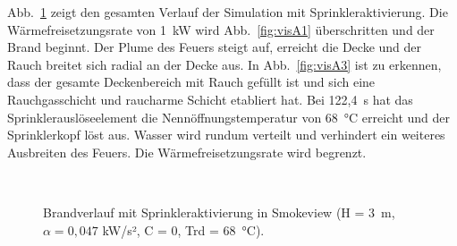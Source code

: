 Abb.~\ref{fig:visA} zeigt den gesamten Verlauf der Simulation mit Sprinkleraktivierung. Die Wärmefreisetzungsrate von 1~kW wird Abb.~\ref{fig:visA1} überschritten und der Brand beginnt. Der Plume des Feuers steigt auf, erreicht die Decke und der Rauch breitet sich radial an der Decke aus. In Abb.~\ref{fig:visA3} ist zu erkennen, dass der gesamte Deckenbereich mit Rauch gefüllt ist und sich eine Rauchgasschicht und raucharme Schicht etabliert hat. Bei 122,4~s hat das Sprinklerauslöseelement die Nennöffnungstemperatur von 68~°C erreicht und der Sprinklerkopf löst aus. Wasser wird rundum verteilt und verhindert ein weiteres Ausbreiten des Feuers. Die Wärmefreisetzungsrate wird begrenzt.
\begin{figure}[h]\centering
{}%
\hspace{8pt}%
\\
%
\hspace{8pt}%
%
\caption{Brandverlauf mit Sprinkleraktivierung in Smokeview (H = 3~m, $\alpha=0,047$ kW/s², C = 0, Trd = 68~°C).}%
\label{fig:visA}%
\end{figure}

